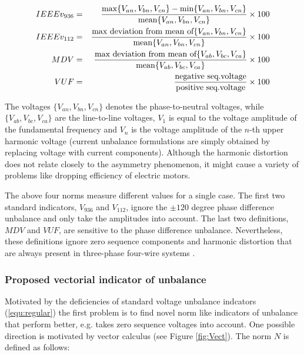             \begin{eqnarray}
              IEEEv_{936}&=&\frac{\max\{V_{an},V_{bn},V_{cn}\}-\min\{V_{an},V_{bn},V_{cn}\}}{\textnormal{mean}\{V_{an},V_{bn},V_{cn}\}}\times100\\
              IEEEv_{112}&=&\frac{\textnormal{max deviation from mean of}\{V_{an},V_{bn},V_{cn}\}}{\textnormal{mean}\{V_{an},V_{bn},V_{cn}\}}\times100\\
              MDV&=&\frac{\textnormal{max deviation from mean of}\{V_{ab},V_{bc},V_{ca}\}}{\textnormal{mean}\{V_{ab},V_{bc},V_{ca}\}}\times100\\
              VUF&=&\frac{\textnormal{negative seq.voltage}}{\textnormal{positive seq.voltage}}\times100
              \label{equ:regular}
              \end{eqnarray}

            The voltages $\{V_{an},V_{bn},V_{cn}\}$ denotes the phase-to-neutral voltages, while $\{V_{ab},V_{bc},V_{ca}\}$ are the line-to-line voltages, $V_1$ is equal to the voltage amplitude of the fundamental frequency and $V_n$ is the voltage amplitude of the $n$-th upper harmonic voltage \cite{bina2011three}  (current unbalance formulations are simply obtained by replacing voltage with current components). Although the harmonic distortion does not relate closely to the asymmetry phenomenon, it might cause a variety of problems like dropping efficiency of electric motors.

            The above four norms measure different values for a single case. The first two standard indicators, $V_{936}$ and $V_{112}$, ignore the $\pm120$ degree phase difference unbalance and only take the amplitudes into account. The last two definitions, $MDV$ and $VUF$, are sensitive to the phase difference unbalance. Nevertheless, these definitions ignore zero sequence components and harmonic distortion that are always present in three-phase four-wire systems \cite{bina2011three}.

         \subsubsection{Proposed vectorial indicator of unbalance}

             Motivated by the deficiencies of standard voltage unbalance indcators (\ref{equ:regular}) the first problem is to find novel norm like indicators of unbalance that perform better, e.g. takes zero sequence voltages into account. One possible direction is motivated by vector calculus (see Figure \ref{fig:Vect}). The norm $N$ is defined as follows:

